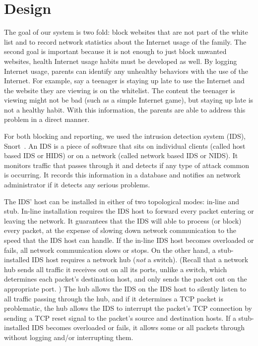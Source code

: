 
\section{Design}

The goal of our system is two fold: block websites that are not part of the
white list and to record network statistics about the Internet usage of the
family. The second goal is important because it is not enough to just block
unwanted websites, health Internet usage habits must be developed as well. By
logging Internet usage, parents can identify any unhealthy behaviors with the
use of the Internet. For example, say a teenager is staying up late to use the
Internet and the website they are viewing is on the whitelist. The content the
teenager is viewing might not be bad (such as a simple Internet game), but
staying up late is not a healthy habit. With this information, the parents are
able to address this problem in a direct manner.

For both blocking and reporting, we used the intrusion detection system (IDS),
Snort~\cite{snort}. An IDS is a piece of software that sits on individual
clients (called host based IDS or HIDS) or on a network (called network based
IDS or NIDS). It monitors traffic that passes through it and detects if any
type of attack common is occurring. It records this information in a database
and notifies an network administrator if it detects any serious problems.

The IDS' host can be installed in either of two topological modes: in-line and
stub.
%
In-line installation requires the IDS host to forward every packet entering or
leaving the network.
%
It guarantees that the IDS will able to process (or block) every packet, at
the expense of slowing down network communication to the speed that the IDS
host can handle.
%
If the in-line IDS host becomes overloaded or fails, all network communication slows
or stops.
%
On the other hand, a stub-installed IDS host requires a network hub (\emph{not} a
switch).
%
(Recall that a network hub sends all traffic it receives out on all its ports,
unlike a switch, which determines each packet's destination host, and only
sends the packet out on the appropriate port. )
%
The hub allows the IDS on the IDS host to silently listen to all traffic
passing through the hub, and if it determines a TCP packet is problematic, the
hub allows the IDS to interrupt the packet's TCP connection by sending a TCP
reset signal to the packet's source and destination hosts.
%
If a stub-installed IDS becomes overloaded or fails, it allows some or all
packets through without logging and/or interrupting them.

